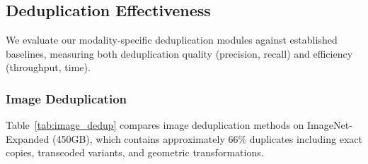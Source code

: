 \documentclass[conference]{IEEEtran}
\renewcommand{\arraystretch}{1.15}
\begin{document}

\subsection{Deduplication Effectiveness}

We evaluate our modality-specific deduplication modules against established baselines, measuring both deduplication quality (precision, recall) and efficiency (throughput, time).

\subsubsection{Image Deduplication}
Table~\ref{tab:image_dedup} compares image deduplication methods on ImageNet-Expanded (450GB), which contains approximately 66\% duplicates including exact copies, transcoded variants, and geometric transformations.
\end{document}
